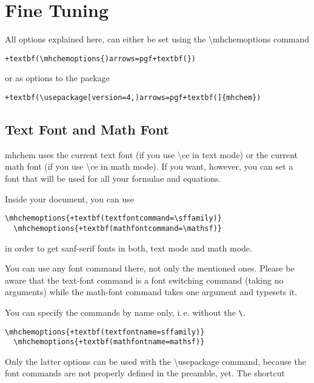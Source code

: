 \documentclass[a4paper,notitlepage,parskip=half]{scrreprt}
\newcommand\macro[1]{{\ttfamily\textbackslash#1}}
\begin{document}
\section{Fine Tuning}\label{sec:FineTuning}

All options explained here, can either be set using the \macro{mhchemoptions} command

\begin{Verbatim}[commandchars=+()]
  +textbf(\mhchemoptions{)arrows=pgf+textbf(})
\end{Verbatim}

or as options to the package

\begin{Verbatim}[commandchars=+()]
  +textbf(\usepackage[version=4,)arrows=pgf+textbf(]{mhchem})
\end{Verbatim}


\subsection{Text Font and Math Font} \label{sec:Fonts}

mhchem uses the current text font (if you use \macro{ce} in text mode) or the  current math font (if you use \macro{ce} in math mode). If you want, however, you can set a font that will be used for all your formulae and equations.

Inside your document, you can use

\begin{Verbatim}[commandchars=+()]
  \mhchemoptions{+textbf(textfontcommand=\sffamily)}
  \mhchemoptions{+textbf(mathfontcommand=\mathsf)}
\end{Verbatim}

in order to get sanf-serif fonts in both, text mode and math mode.

You can use any font command there, not only the mentioned ones. Please be aware that the text-font command is a font switching command (taking no arguments) while the math-font command takes one argument and typesets it.

You can specify the commands by name only, i.\,e. without the \verb|\|.

\begin{Verbatim}[commandchars=+()]
  \mhchemoptions{+textbf(textfontname=sffamily)}
  \mhchemoptions{+textbf(mathfontname=mathsf)}
\end{Verbatim}

\noindent
Only the latter options can be used with the \macro{usepackage} command, because the font commands are not properly defined in the preamble, yet. The shortcut
\end{document}

